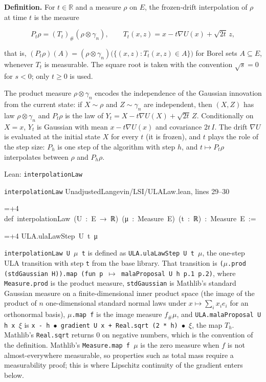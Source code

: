 \documentclass[11pt,a4paper]{report}
\newlength{\leancharwidth}
\newenvironment{leancode}{\par\smallskip\begingroup\ttfamily\footnotesize\raggedright
  \settowidth{\leancharwidth}{M}\setlength{\parskip}{0pt}\setlength{\parindent}{0pt}
  \frenchspacing}{\par\endgroup\smallskip}
\newcommand{\leanline}[2]{\hangindent=\dimexpr#1\leancharwidth+4\leancharwidth\relax
  \hangafter=1\noindent\hspace*{#1\leancharwidth}#2\par}
\newcommand{\leansource}[1]{\par{\footnotesize\color{leanmuted}#1}\par}
\newcommand{\leanlabel}[1]{\par\smallskip\noindent{\small\bfseries #1}\par}
\begin{document}
\textbf{Definition.} For \(t\in\mathbb R\) and a measure \(\rho\) on \(E\), the frozen-drift interpolation of \(\rho\) at time \(t\) is the measure


\[P_t\rho=(T_t)_\#(\rho\otimes\gamma_n),\qquad T_t(x,z)=x-t\nabla U(x)+\sqrt{2t}\,z,\]


that is, \((P_t\rho)(A)=(\rho\otimes\gamma_n)\bigl(\{(x,z):T_t(x,z)\in A\}\bigr)\) for Borel sets \(A\subseteq E\), whenever \(T_t\) is measurable. The square root is taken with the convention \(\sqrt s=0\) for \(s<0\); only \(t\ge0\) is used.




The product measure \(\rho\otimes\gamma_n\) encodes the independence of the Gaussian innovation from the current state: if \(X\sim\rho\) and \(Z\sim\gamma_n\) are independent, then \((X,Z)\) has law \(\rho\otimes\gamma_n\) and \(P_t\rho\) is the law of \(Y_t=X-t\nabla U(X)+\sqrt{2t}\,Z\). Conditionally on \(X=x\), \(Y_t\) is Gaussian with mean \(x-t\nabla U(x)\) and covariance \(2t\,I\). The drift \(\nabla U\) is evaluated at the initial state \(X\) for every \(t\) (it is frozen), and \(t\) plays the role of the step size: \(P_h\) is one step of the algorithm with step \(h\), and \(t\mapsto P_t\rho\) interpolates between \(\rho\) and \(P_h\rho\).

\begin{leanbox}{Lean: \texttt{interpolationLaw}}
\leansource{\texttt{interpolationLaw} \quad UnadjustedLangevin/\allowbreak{}LSI/\allowbreak{}ULALaw.lean, lines 29–30}
\begin{leancode}
\leanline{0}{def\ interpolationLaw\ (U\ :\ E\ →\ ℝ)\ (μ\ :\ Measure\ E)\ (t\ :\ ℝ)\ :\ Measure\ E\ :=}
\leanline{2}{ULA.ulaLawStep\ U\ t\ μ}
\end{leancode}
\leanlabel{How the Lean proof follows the argument}
\texttt{interpolation\allowbreak{}Law U \ensuremath{\mu} t} is defined as \texttt{ULA.\allowbreak{}ula\allowbreak{}Law\allowbreak{}Step U t \ensuremath{\mu}}, the one-step ULA transition with step \texttt{t} from the base library. That transition is \texttt{(\ensuremath{\mu}.\allowbreak{}prod (std\allowbreak{}Gaussian H)).\allowbreak{}map (fun p \ensuremath{\mapsto} mala\allowbreak{}Proposal U h p.\allowbreak{}1 p.\allowbreak{}2)}, where \texttt{Measure.\allowbreak{}prod} is the product measure, \texttt{std\allowbreak{}Gaussian} is Mathlib's standard Gaussian measure on a finite-dimensional inner product space (the image of the product of \(n\) one-dimensional standard normal laws under \(x\mapsto\sum_ix_ie_i\) for an orthonormal basis), \texttt{\ensuremath{\mu}.\allowbreak{}map f} is the image measure \(f_\#\mu\), and \texttt{ULA.\allowbreak{}mala\allowbreak{}Proposal U h x \ensuremath{\xi}} is \texttt{x -\allowbreak{} h \ensuremath{\bullet} gradient U x + Real.\allowbreak{}sqrt (2 * h) \ensuremath{\bullet} \ensuremath{\xi}}, the map \(T_h\). Mathlib's \texttt{Real.\allowbreak{}sqrt} returns \(0\) on negative numbers, which is the convention of the definition. Mathlib's \texttt{Measure.\allowbreak{}map f \ensuremath{\mu}} is the zero measure when \(f\) is not almost-everywhere measurable, so properties such as total mass require a measurability proof; this is where Lipschitz continuity of the gradient enters below.
\end{leanbox}
\end{document}
